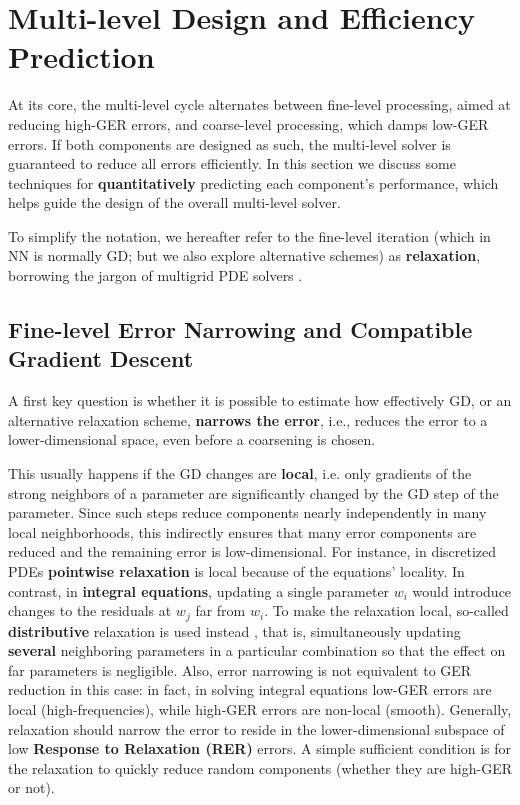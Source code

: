 \documentclass{article} %
\begin{document}

\section{Multi-level Design and Efficiency Prediction}
\label{sec:predictors}
At its core, the multi-level cycle alternates between fine-level processing, aimed at reducing high-GER errors, and coarse-level processing, which damps low-GER errors. If both components are designed as such, the multi-level solver is guaranteed to reduce all errors efficiently. In this section we discuss some techniques for \textbf{quantitatively} predicting each component's performance, which helps guide the design of the overall multi-level solver.

To simplify the notation, we hereafter refer to the fine-level iteration (which in NN is normally GD; but we also explore alternative schemes) as \textbf{relaxation}, borrowing the jargon of multigrid PDE solvers \cite[Sec.~1]{guide}.

\subsection{Fine-level Error Narrowing and Compatible Gradient Descent}
\label{sec:gd_local}
A first key question is whether it is possible to estimate how effectively GD, or an alternative relaxation scheme, \textbf{narrows the error}, i.e., reduces the error to a lower-dimensional space, even before a coarsening is chosen. 

This usually happens if the GD changes are \textbf{local}, i.e. only gradients of the strong neighbors of a parameter are significantly changed by the GD step of the parameter. Since such steps reduce components nearly independently in many local neighborhoods, this indirectly ensures that many error components are reduced and the remaining error is low-dimensional. For instance, in discretized PDEs \textbf{pointwise relaxation} \cite[Sec.~1]{guide} is local because of the equations' locality. In contrast, in \textbf{integral equations}, updating a single parameter $w_i$ would introduce changes to the residuals at $w_j$ far from $w_i$. To make the relaxation local, so-called \textbf{distributive} relaxation is used instead \cite{lubrecht}, that is, simultaneously updating \textbf{several} neighboring parameters in a particular combination so that the effect on far parameters is negligible. Also, error narrowing is not equivalent to GER reduction in this case: in fact, in solving integral equations low-GER errors are local (high-frequencies), while high-GER errors are non-local (smooth). Generally, relaxation should narrow the error to reside in the lower-dimensional subspace of low \textbf{Response to Relaxation (RER)} errors. A simple sufficient condition is for the relaxation to quickly reduce random components (whether they are high-GER or not).
\end{document}
